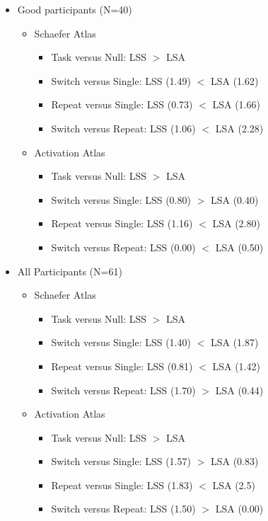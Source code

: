 \documentclass[10pt,letterpaper]{article}
\begin{document}
\begin{itemize}
  \item Good participants (N=40)
  \begin{itemize} 
    \item Schaefer Atlas
    \begin{itemize}
      \item Task versus Null: LSS $>$ LSA
      \item Switch versus Single: LSS (1.49) $<$ LSA (1.62)
      \item Repeat versus Single: LSS (0.73) $<$ LSA (1.66)
      \item Switch versus Repeat: LSS (1.06) $<$ LSA (2.28)
    \end{itemize}
    \item Activation Atlas
    \begin{itemize}
      \item Task versus Null: LSS $>$ LSA
      \item Switch versus Single: LSS (0.80) $>$ LSA (0.40)
      \item Repeat versus Single: LSS (1.16) $<$ LSA (2.80)
      \item Switch versus Repeat: LSS (0.00) $<$ LSA (0.50)
    \end{itemize}
  \end{itemize}
  \item All Participants (N=61)
  \begin{itemize} 
    \item Schaefer Atlas
    \begin{itemize}
      \item Task versus Null: LSS $>$ LSA
      \item Switch versus Single: LSS (1.40) $<$ LSA (1.87)
      \item Repeat versus Single: LSS (0.81) $<$ LSA (1.42)
      \item Switch versus Repeat: LSS (1.70) $>$ LSA (0.44)
    \end{itemize}
    \item Activation Atlas
    \begin{itemize}
      \item Task versus Null: LSS $>$ LSA
      \item Switch versus Single: LSS (1.57) $>$ LSA (0.83)
      \item Repeat versus Single: LSS (1.83) $<$ LSA (2.5)
      \item Switch versus Repeat: LSS (1.50) $>$ LSA (0.00)
    \end{itemize}
  \end{itemize}
\end{itemize}
\end{document}
